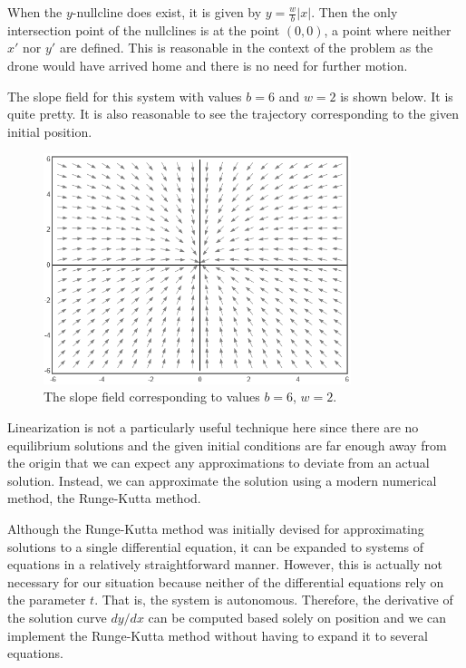 \documentclass{article}
\begin{document}
    When the $y$-nullcline does exist, it is given by $y =
    \frac{w}{b}|x|$. Then the only intersection point of the nullclines is at
    the point $(0, 0)$, a point where neither $x'$ nor $y'$ are defined.
    This is reasonable in the context of the problem as the drone would have arrived
    home and there is no need for further motion.

    The slope field for this system with values $b = 6$ and $w = 2$ is shown
    below. It is quite pretty. It is also reasonable to see the trajectory
    corresponding to the given initial position.

    \begin{figure}[H] 
        \centering
        \includegraphics[width=0.8\textwidth]{media/slopeField.png}
        \caption{\label{fig:slope-field-1} The slope field corresponding to
        values $b = 6$, $w = 2$.}
    \end{figure}

    Linearization is not a particularly useful technique here since there are no
    equilibrium solutions and the given initial conditions are far enough away
    from the origin that we can expect any approximations to deviate from an
    actual solution. Instead, we can approximate the solution using a modern
    numerical method, the Runge-Kutta method.

    Although the Runge-Kutta method was initially devised for approximating
    solutions to a single differential equation, it can be expanded to systems
    of equations in a relatively straightforward manner. However, this is
    actually not necessary for our situation because neither of the differential
    equations rely on the parameter $t$. That is, the system is
    autonomous. Therefore, the derivative of the solution curve $dy / dx$ can be
    computed based solely on position and we can implement the Runge-Kutta
    method without having to expand it to several equations.
\end{document}
